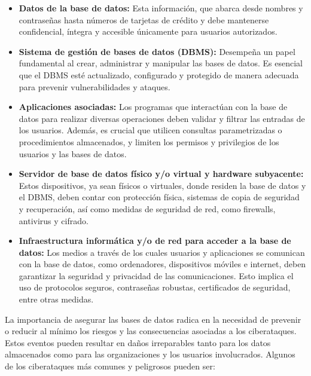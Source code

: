 \documentclass[11pt]{report}
\begin{document}
\begin{itemize}
\item \textbf{Datos de la base de datos:} Esta información, que abarca desde nombres y
contraseñas hasta números de tarjetas de crédito y debe mantenerse confidencial,
íntegra y accesible únicamente para usuarios autorizados.
\item \textbf{Sistema de gestión de bases de datos (DBMS):} Desempeña un papel fundamental
al crear, administrar y manipular las bases de datos. Es esencial que el DBMS esté
actualizado, configurado y protegido de manera adecuada para prevenir
vulnerabilidades y ataques.
\item \textbf{Aplicaciones asociadas:} Los programas que interactúan con la base de datos para
realizar diversas operaciones deben validar y filtrar las entradas de los usuarios.
Además, es crucial que utilicen consultas parametrizadas o procedimientos
almacenados, y limiten los permisos y privilegios de los usuarios y las bases de
datos.
\item \textbf{Servidor de base de datos físico y/o virtual y hardware subyacente:} Estos
dispositivos, ya sean físicos o virtuales, donde residen la base de datos y el DBMS,
deben contar con protección física, sistemas de copia de seguridad y recuperación,
así como medidas de seguridad de red, como firewalls, antivirus y cifrado.
\item \textbf{Infraestructura informática y/o de red para acceder a la base de datos:} Los medios a
través de los cuales usuarios y aplicaciones se comunican con la base de datos,
como ordenadores, dispositivos móviles e internet, deben garantizar la seguridad y
privacidad de las comunicaciones. Esto implica el uso de protocolos seguros,
contraseñas robustas, certificados de seguridad, entre otras medidas.
\end{itemize}

La importancia de asegurar las bases de datos radica en la necesidad de prevenir o reducir
al mínimo los riesgos y las consecuencias asociadas a los ciberataques. Estos eventos
pueden resultar en daños irreparables tanto para los datos almacenados como para las
organizaciones y los usuarios involucrados. Algunos de los ciberataques más comunes y
peligrosos pueden ser:
\end{document}
